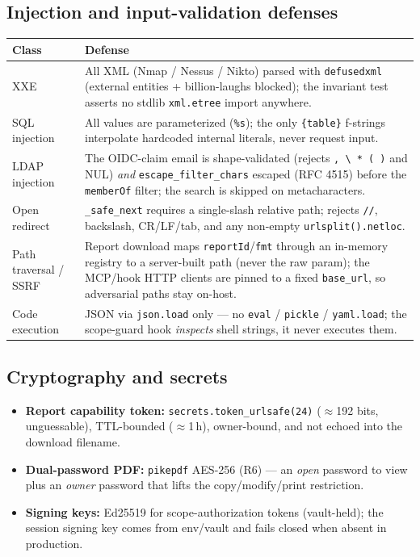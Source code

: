 \documentclass[11pt,a4paper]{article}
\newcommand{\code}[1]{\texttt{#1}}
\begin{document}
\subsection{Injection and input-validation defenses}
\begin{longtable}{L{3.1cm} L{11.2cm}}
\toprule
\textbf{Class} & \textbf{Defense} \\
\midrule
\endhead
XXE & All XML (Nmap / Nessus / Nikto) parsed with \code{defusedxml} (external
entities + billion-laughs blocked); the invariant test asserts no stdlib
\code{xml.etree} import anywhere. \\
\addlinespace
SQL injection & All values are parameterized (\code{\%s}); the only \code{\{table\}}
f-strings interpolate hardcoded internal literals, never request input. \\
\addlinespace
LDAP injection & The OIDC-claim email is shape-validated (rejects
\code{, \textbackslash\ * ( )} and NUL) \emph{and} \code{escape\_filter\_chars}
escaped (RFC 4515) before the \code{memberOf} filter; the search is skipped on
metacharacters. \\
\addlinespace
Open redirect & \code{\_safe\_next} requires a single-slash relative path; rejects
\code{//}, backslash, CR/LF/tab, and any non-empty \code{urlsplit().netloc}. \\
\addlinespace
Path traversal / SSRF & Report download maps \code{reportId}/\code{fmt} through an
in-memory registry to a server-built path (never the raw param); the MCP/hook
HTTP clients are pinned to a fixed \code{base\_url}, so adversarial paths stay
on-host. \\
\addlinespace
Code execution & JSON via \code{json.load} only --- no \code{eval} / \code{pickle}
/ \code{yaml.load}; the scope-guard hook \emph{inspects} shell strings, it never
executes them. \\
\bottomrule
\end{longtable}

\subsection{Cryptography and secrets}
\begin{itemize}
  \item \textbf{Report capability token:} \code{secrets.token\_urlsafe(24)}
        ($\approx$192 bits, unguessable), TTL-bounded ($\approx$1\,h), owner-bound,
        and not echoed into the download filename.
  \item \textbf{Dual-password PDF:} \code{pikepdf} AES-256 (R6) --- an \emph{open}
        password to view plus an \emph{owner} password that lifts the
        copy/modify/print restriction.
  \item \textbf{Signing keys:} Ed25519 for scope-authorization tokens (vault-held);
        the session signing key comes from env/vault and fails closed when absent
        in production.
\end{itemize}
\end{document}
